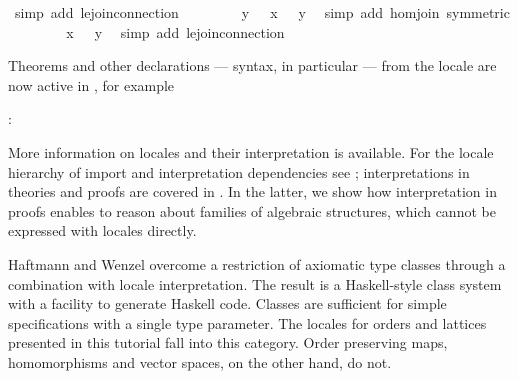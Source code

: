 \begin{isabellebody}
\ {\isacharparenleft}simp\ add{\isacharcolon}\ le{\isachardot}join{\isacharunderscore}connection{\isacharparenright}\isanewline
\ \ \ \ \isamarkupfalse%
\ \isamarkupfalse%
\ {\isachardoublequoteopen}{\isasymphi}\ y\ {\isacharequal}\ {\isacharparenleft}{\isasymphi}\ x\ {\isasymsqunion}{\isacharprime}\ {\isasymphi}\ y{\isacharparenright}{\isachardoublequoteclose}\ \isamarkupfalse%
\ {\isacharparenleft}simp\ add{\isacharcolon}\ hom{\isacharunderscore}join\ {\isacharbrackleft}symmetric{\isacharbrackright}{\isacharparenright}\isanewline
\ \ \ \ \isamarkupfalse%
\ \isamarkupfalse%
\ {\isachardoublequoteopen}{\isasymphi}\ x\ {\isasympreceq}\ {\isasymphi}\ y{\isachardoublequoteclose}\ \isamarkupfalse%
\ {\isacharparenleft}simp\ add{\isacharcolon}\ le{\isacharprime}{\isachardot}join{\isacharunderscore}connection{\isacharparenright}\isanewline
\ \ \isamarkupfalse%
%
\endisatagproof
{\isafoldproof}%
%
\isadelimproof
%
\endisadelimproof
%
\begin{isamarkuptext}%
Theorems and other declarations --- syntax, in particular ---
  from the locale  are now active in , for example

  :
\end{isamarkuptext}%
\isamarkuptrue%
%
\isamarkuptrue%
%
\begin{isamarkuptext}%
More information on locales and their interpretation is
  available.  For the locale hierarchy of import and interpretation
  dependencies see \cite{Ballarin2006a}; interpretations in theories
  and proofs are covered in \cite{Ballarin2006b}.  In the latter, we
  show how interpretation in proofs enables to reason about families
  of algebraic structures, which cannot be expressed with locales
  directly.

  Haftmann and Wenzel \cite{HaftmannWenzel2007} overcome a restriction
  of axiomatic type classes through a combination with locale
  interpretation.  The result is a Haskell-style class system with a
  facility to generate Haskell code.  Classes are sufficient for
  simple specifications with a single type parameter.  The locales for
  orders and lattices presented in this tutorial fall into this
  category.  Order preserving maps, homomorphisms and vector spaces,
  on the other hand, do not.


\end{isamarkuptext}
\end{isabellebody}
